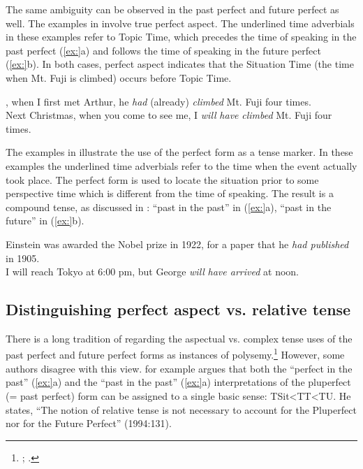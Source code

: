 The same ambiguity can be observed in the past perfect and future perfect as well. The examples in  involve true perfect aspect. The underlined time adverbials in these examples refer to Topic Time, which precedes the time of speaking in the past perfect (\ref{ex:}a) and follows the time of speaking in the future perfect (\ref{ex:}b). In both cases, perfect aspect indicates that the Situation Time (the time when Mt. Fuji is climbed) occurs before Topic Time.


\ea
{}, when I first met Arthur, he \textit{had} (already) \textit{climbed} Mt. Fuji four times.\\
\ex Next Christmas, when you come to see me, I \textit{will} \textit{have} \textit{climbed} Mt. Fuji four times.
                       \z
\z


The examples in  illustrate the use of the perfect form as a tense marker. In these examples the underlined time adverbials refer to the time when the event actually took place. The perfect form is used to locate the situation prior to some perspective time which is different from the time of speaking. The result is a compound tense, as discussed in : “past in the past” in (\ref{ex:}a), “past in the future” in (\ref{ex:}b).


\ea
\ea Einstein was awarded the Nobel prize in 1922, for a paper that he \textit{had published}\\
  in 1905.\\
\ex I will reach Tokyo at 6:00 pm, but George \textit{will} \textit{have arrived} at noon.
                       \z
\z

\subsection{Distinguishing perfect aspect vs. relative tense}\label{sec:} %

There is a long tradition of regarding the aspectual vs. complex tense uses of the past perfect and future perfect forms as instances of polysemy.\footnote{\citet{Jespersen1924}; \citet{Comrie1976}.} However, some authors disagree with this view. \citet{Klein1994} for example argues that both the “perfect in the past” (\ref{ex:}a) and the “past in the past” (\ref{ex:}a) interpretations of the pluperfect (= past perfect) form can be assigned to a single basic sense: TSit<TT<TU. He states, “The notion of relative tense is not necessary to account for the Pluperfect nor for the Future Perfect” (1994:131).



